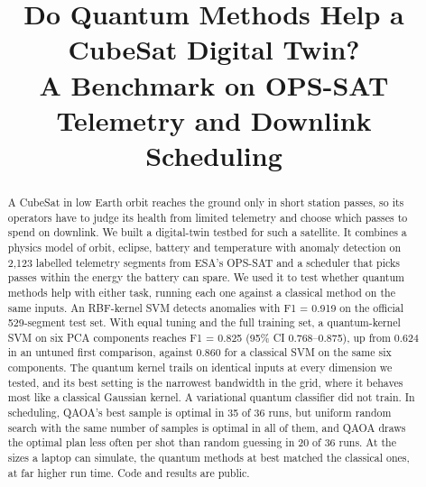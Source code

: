 \documentclass[conference]{IEEEtran}
\begin{document}
\title{Do Quantum Methods Help a CubeSat Digital Twin?\\
A Benchmark on OPS-SAT Telemetry and Downlink Scheduling}

\author{
}

\maketitle

\begin{abstract}
A CubeSat in low Earth orbit reaches the ground only in short station passes, so its operators
have to judge its health from limited telemetry and choose which passes to spend on downlink.
We built a digital-twin testbed for such a satellite. It combines a physics model of orbit,
eclipse, battery and temperature with anomaly detection on 2,123 labelled telemetry segments
from ESA's OPS-SAT and a scheduler that picks passes within the energy the battery can spare.
We used it to test whether quantum methods help with either task, running each one against a
classical method on the same inputs. An RBF-kernel SVM detects anomalies with F1 = 0.919 on the
official 529-segment test set. With equal tuning and the full training set, a quantum-kernel
SVM on six PCA components reaches F1 = 0.825 (95\% CI 0.768--0.875), up from 0.624 in an
untuned first comparison, against 0.860 for a classical SVM on the same six components. The
quantum kernel trails on identical inputs at every dimension we tested, and its best setting is
the narrowest bandwidth in the grid, where it behaves most like a classical Gaussian kernel. A
variational quantum classifier did not train. In scheduling, QAOA's best sample is optimal in 35 of 36 runs, but uniform random search
with the same number of samples is optimal in all of them, and QAOA draws the optimal plan
less often per shot than random guessing in 20 of 36 runs. At the sizes a laptop can
simulate, the quantum methods at best matched the classical ones, at far higher run time. Code and results are public.
\end{abstract}
\end{document}
